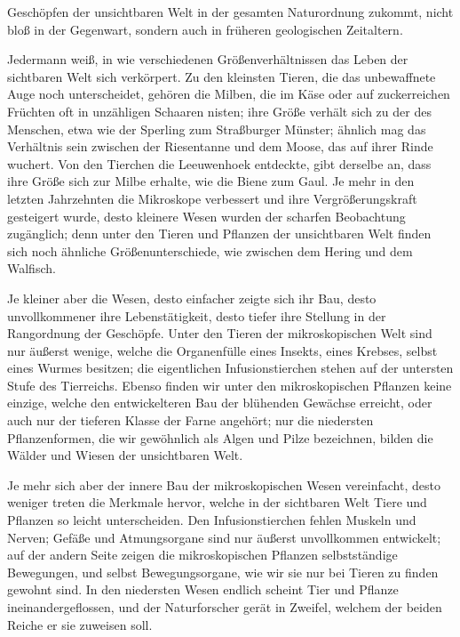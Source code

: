 \documentclass[a4paper, 11pt, oneside, english]{article}
\begin{document}
Geschöpfen der unsichtbaren Welt in der gesamten Naturordnung zukommt, nicht bloß in der Gegenwart, sondern auch in früheren geologischen Zeitaltern.

Jedermann weiß, in wie verschiedenen Größenverhältnissen das Leben der sichtbaren Welt sich verkörpert. Zu den kleinsten Tieren, die das unbewaffnete Auge noch unterscheidet, gehören die Milben, die im Käse oder auf zuckerreichen Früchten oft in unzähligen Schaaren nisten; ihre Größe verhält sich zu der des Menschen, etwa wie der Sperling zum Straßburger Münster; ähnlich mag das Verhältnis sein zwischen der Riesentanne und dem Moose, das auf ihrer Rinde wuchert. Von den Tierchen die Leeuwenhoek entdeckte, gibt derselbe an, dass ihre Größe sich zur Milbe erhalte, wie die Biene zum Gaul. Je mehr in den letzten Jahrzehnten die Mikroskope verbessert und ihre Vergrößerungskraft gesteigert wurde, desto kleinere Wesen wurden der scharfen Beobachtung zugänglich; denn unter den Tieren und Pflanzen der unsichtbaren Welt finden sich noch ähnliche Größenunterschiede, wie zwischen dem Hering und dem Walfisch.

Je kleiner aber die Wesen, desto einfacher zeigte sich ihr Bau, desto unvollkommener ihre Lebenstätigkeit, desto tiefer ihre Stellung in der Rangordnung der Geschöpfe. Unter den Tieren der mikroskopischen Welt sind nur äußerst wenige, welche die Organenfülle eines Insekts, eines Krebses, selbst eines Wurmes besitzen; die eigentlichen Infusionstierchen stehen auf der untersten Stufe des Tierreichs. Ebenso finden wir unter den mikroskopischen Pflanzen keine einzige, welche den entwickelteren Bau der blühenden Gewächse erreicht, oder auch nur der tieferen Klasse der Farne angehört; nur die niedersten Pflanzenformen, die wir gewöhnlich als Algen und Pilze bezeichnen, bilden die Wälder und Wiesen der unsichtbaren Welt.

Je mehr sich aber der innere Bau der mikroskopischen Wesen vereinfacht, desto weniger treten die Merkmale hervor, welche in der sichtbaren Welt Tiere und Pflanzen so leicht unterscheiden. Den Infusionstierchen fehlen Muskeln und Nerven; Gefäße und Atmungsorgane sind nur äußerst unvollkommen entwickelt; auf der andern Seite zeigen die mikroskopischen Pflanzen selbstständige Bewegungen, und selbst Bewegungsorgane, wie wir sie nur bei Tieren zu finden gewohnt sind. In den niedersten Wesen endlich scheint Tier und Pflanze ineinandergeflossen, und der Naturforscher gerät in Zweifel, welchem der beiden Reiche er sie zuweisen soll.
\end{document}
